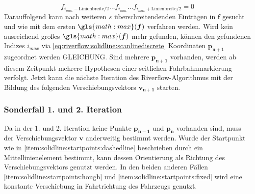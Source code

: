 \begin{equation}
f_{i_{max}-\text{Linienbreite}/2}  \dots f_{i_{max}} 
 \dots  f_{i_{max}+\text{Linienbreite}/2} = 0
 \end{equation}
Darauffolgend kann nach weiteren \begin{math} s \end{math} überschreitendenden Einträgen in \begin{math} \boldsymbol{f} \end{math} gesucht und wie mit dem ersten \begin{math} \gls{math:max}(\boldsymbol{f})  \end{math} verfahren werden.
Wird kein ausreichend großes \begin{math} \gls{math:max}(\boldsymbol{f}) \end{math} mehr gefunden, können den gefundenen Indizes \begin{math} i_{max} \end{math} via \eqref{eq:riverflow:solidline:scanlinediscrete} Koordinaten \begin{math} \boldsymbol{p_{n+1}} \end{math} zugeordnet werden GLEICHUNG.
Sind mehrere \begin{math} \boldsymbol{p_{n+1}} \end{math} vorhanden, werden ab diesem Zeitpunkt mehrere Hypothesen einer seitlichen Fahrbahnmarkierung verfolgt.
Jetzt kann die nächste Iteration des Riverflow-Algorithmus mit der Bildung des folgenden Verschiebungsvektors \begin{math} \boldsymbol{v_{n+1}} \end{math} starten.

\subsubsection{Sonderfall 1. und 2. Iteration}
Da in der 1. und 2. Iteration keine Punkte \begin{math} \boldsymbol{p_{n-1}} \end{math} und \begin{math} \boldsymbol{p_n} \end{math}  vorhanden sind, muss der Verschiebungsvektor \begin{math} \boldsymbol{v} \end{math} anderweitig bestimmt werden. 
Wurde der Startpunkt wie in \ref{item:solidline:startpoints:dashedline} beschrieben durch ein Mittellinienelement bestimmt, kann dessen Orientierung als Richtung des Verschiebungsvektors genutzt werden.
In den beiden anderen Fällen \ref{item:solidline:startpoints:hough} und \ref{item:solidline:startpoints:fixed} wird eine konstante Verschiebung in Fahrtrichtung des Fahrzeugs genutzt.

